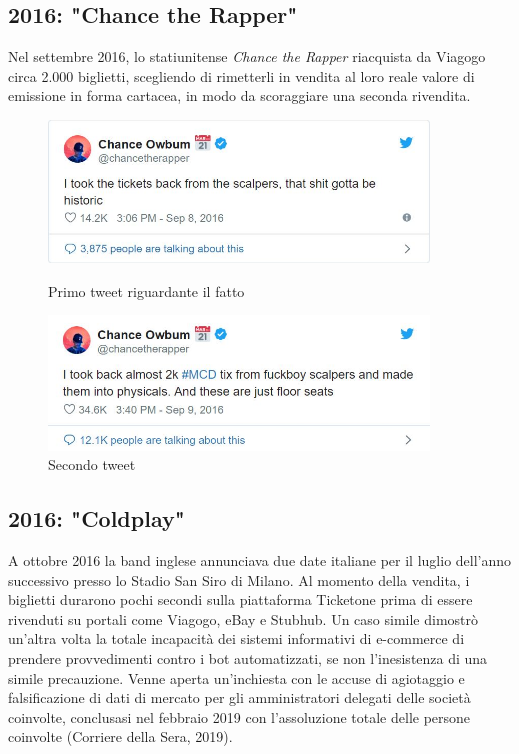 \subsection{2016: "Chance the Rapper"}
Nel settembre 2016, lo statiunitense \textit{\emph{Chance the Rapper}} riacquista da Viagogo circa 2.000 biglietti, scegliendo di rimetterli in vendita al loro reale valore di emissione in forma cartacea, in modo da scoraggiare una seconda rivendita. 
\begin{figure}[htbp]
    \centering
    \begin{minipage}{0.45\textwidth}
        \centering
        \includegraphics[width=0.9\textwidth]{chapter2/immagini/chance1} %
        \caption{Primo tweet riguardante il fatto}
    \end{minipage}\hfill
    \begin{minipage}{0.45\textwidth}
        \centering
        \includegraphics[width=0.9\textwidth]{chapter2/immagini/chance2} %
        \caption{Secondo tweet}
    \end{minipage}
\end{figure}

\subsection{2016: "Coldplay"} \label{coldplay}
A ottobre 2016 la band inglese annunciava due date italiane per il luglio dell'anno successivo presso lo Stadio San Siro di Milano. Al momento della vendita, i biglietti durarono pochi secondi sulla piattaforma Ticketone prima di essere rivenduti su portali come Viagogo, eBay e Stubhub. Un caso simile dimostrò un'altra volta la totale incapacità dei sistemi informativi di e-commerce di prendere provvedimenti contro i bot automatizzati, se non l'inesistenza di una simile precauzione.
Venne aperta un'inchiesta con le accuse di agiotaggio e falsificazione di dati di mercato per gli amministratori delegati delle società coinvolte, conclusasi nel febbraio 2019 con l'assoluzione totale delle persone coinvolte (Corriere della Sera, 2019). 

